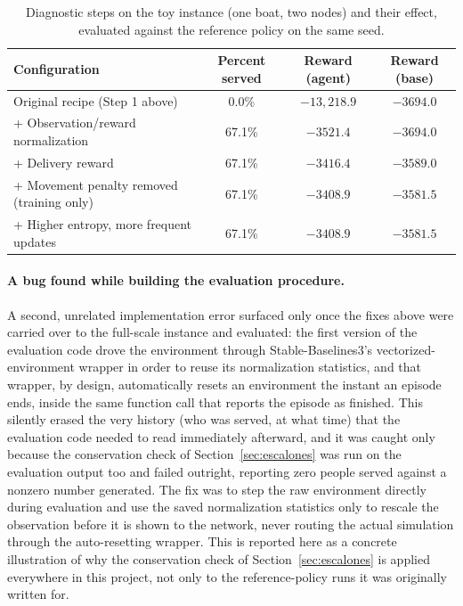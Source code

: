 \documentclass[11pt,a4paper]{article}
\begin{document}
\begin{table}[H]
\centering
\caption{Diagnostic steps on the toy instance (one boat, two nodes) and their effect, evaluated against the reference policy on the same seed.}
\label{tab:diagnostico}
\small
\begin{tabular}{lccc}
\toprule
Configuration & Percent served & Reward (agent) & Reward (base) \\
\midrule
Original recipe (Step 1 above) & 0.0\% & $-13{,}218.9$ & $-3694.0$ \\
+ Observation/reward normalization & 67.1\% & $-3521.4$ & $-3694.0$ \\
+ Delivery reward & 67.1\% & $-3416.4$ & $-3589.0$ \\
+ Movement penalty removed (training only) & 67.1\% & $-3408.9$ & $-3581.5$ \\
+ Higher entropy, more frequent updates & 67.1\% & $-3408.9$ & $-3581.5$ \\
\bottomrule
\end{tabular}
\end{table}

\paragraph{A bug found while building the evaluation procedure.} A second, unrelated implementation error surfaced only once the fixes above were carried over to the full-scale instance and evaluated: the first version of the evaluation code drove the environment through Stable-Baselines3's vectorized-environment wrapper in order to reuse its normalization statistics, and that wrapper, by design, automatically resets an environment the instant an episode ends, inside the same function call that reports the episode as finished. This silently erased the very history (who was served, at what time) that the evaluation code needed to read immediately afterward, and it was caught only because the conservation check of Section~\ref{sec:escalones} was run on the evaluation output too and failed outright, reporting zero people served against a nonzero number generated. The fix was to step the raw environment directly during evaluation and use the saved normalization statistics only to rescale the observation before it is shown to the network, never routing the actual simulation through the auto-resetting wrapper. This is reported here as a concrete illustration of why the conservation check of Section~\ref{sec:escalones} is applied everywhere in this project, not only to the reference-policy runs it was originally written for.
\end{document}
